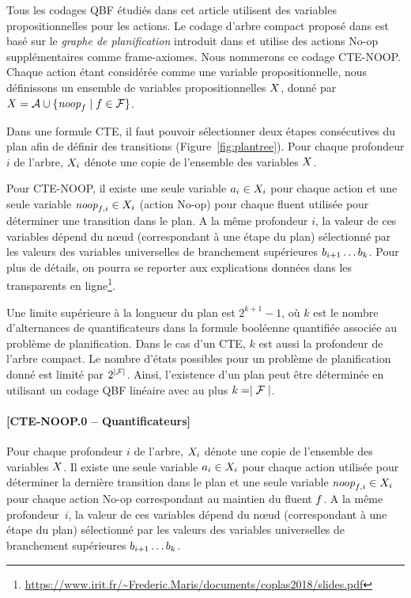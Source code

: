 
Tous les codages QBF étudiés dans cet article utilisent des variables propositionnelles pour les actions. Le codage d'arbre compact proposé dans \cite{DBLP:conf/ecai/CashmoreFG12} est basé sur le \textit{graphe de planification} introduit dans \cite{BF97} et utilise des actions No-op supplémentaires comme frame-axiomes. Nous nommerons ce codage CTE-NOOP.
Chaque action étant considérée comme une variable propositionnelle, nous définissons un ensemble de variables propositionnelles $X$, donné par $X = \mathcal{A} \cup \{\textit{noop}_{f}\mid f\in\mathcal{F}\}$.

Dans une formule CTE, il faut pouvoir sélectionner deux étapes consécutives du plan afin de définir des transitions (Figure~\ref{fig:plantree}). Pour chaque profondeur $i$ de l'arbre, $X_i$ dénote une copie de l'ensemble des variables $X$.

Pour CTE-NOOP, il existe une seule variable $a_{i}\in X_{i}$ pour chaque action et une seule variable $\textit{noop}_{f,i}\in X_{i}$ (action No-op) pour chaque fluent utilisée pour déterminer une transition dans le plan. A la même profondeur $i$, la valeur de ces variables dépend du n\oe ud (correspondant à une étape du plan) sélectionné par les valeurs des variables universelles de branchement supérieures $b_{i+1}\ldots b_{k}$. Pour plus de détails, on pourra se reporter aux explications données dans les transparents en ligne\footnote{\url{https://www.irit.fr/~Frederic.Maris/documents/coplas2018/slides.pdf}}.

Une limite supérieure à la longueur du plan est $2^{k+1}-1$, où $k$ est le nombre d'alternances de quantificateurs dans la formule booléenne quantifiée associée au problème de planification. Dans le cas d'un CTE, $k$ est aussi la profondeur de l'arbre compact. Le nombre d'états possibles pour un problème de planification donné est limité par $2^{\mid \mathcal{F} \mid}$. Ainsi, l'existence d'un plan peut être déterminée en utilisant un codage QBF linéaire avec au plus $k=\mid \mathcal{F} \mid$.



\paragraph*{[CTE-NOOP.0 -- Quantificateurs]}

Pour chaque profondeur $i$ de l'arbre, $X_i$ dénote une copie de l'ensemble des variables $X$. Il existe une seule variable $a_{i}\in X_{i}$ pour chaque action utilisée pour déterminer la dernière transition dans le plan et une seule variable $\textit{noop}_{f,i}\in X_{i}$ pour chaque action No-op correspondant au maintien du fluent $f$. A la même profondeur~$i$, la valeur de ces variables dépend du n\oe ud (correspondant à une étape du plan) sélectionné par les valeurs des variables universelles de branchement supérieures $b_{i+1}\ldots b_{k}$.


